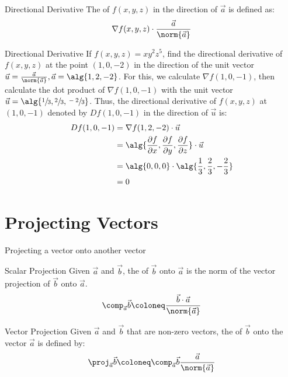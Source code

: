 \documentclass[12pt]{report}
\begin{document}
\begin{dfnbox}{Directional Derivative}{}
    The  of $f(x,y,z)$ in the direction of $\vec{a}$ is defined as:
    \[ \nabla f(x,y,z) \cdot \frac{\vec{a}}{\norm{\vec{a}}} \]
\end{dfnbox}

\begin{exbox}{Directional Derivative}{}
    If $f(x,y,z) = xy^2z^5$, find the directional derivative of $f(x,y,z)$ at the point $(1,0,-2)$ in the direction of the unit vector $\vec{u} = \frac{\vec{a}}{\norm{\vec{a}}}, \vec{a} = \alg{1,2,-2}$.
    \tcblower
    For this, we calculate $\nabla f(1,0,-1)$, then calculate the dot product of $\nabla f(1,0,-1)$ with the unit vector $\vec{u} = \alg{\sfrac{1}{3}, \sfrac{2}{3}, \sfrac{-2}{3}}$. Thus, the directional derivative of $f(x,y,z)$ at $(1,0,-1)$ denoted by $Df(1,0,-1)$ in the direction of $\vec{u}$ is:
    \begin{align*}
        Df(1,0,-1)
        &= \nabla f(1,2,-2) \cdot \vec{u} \\
        &= \alg{\frac{\partial f}{\partial x}, \frac{\partial f}{\partial y}, \frac{\partial f}{\partial z}} \cdot \vec{u} \\
        &= \alg{0,0,0} \cdot \alg{\frac13, \frac23, -\frac23} \\
        &= 0
    \end{align*}
\end{exbox}

\section{Projecting Vectors}
\newcommand{\vectorproj}[2][]{\textit{proj}_{\vect{#1}}\vect{#2}}

Projecting a vector onto another vector

\begin{dfnbox}{Scalar Projection}{}
    Given $\vec{a}$ and $\vec{b}$, the  of $\vec{b}$ onto $\vec{a}$ is the norm of the vector projection of $\vec{b}$ onto $\vec{a}$.
    \tcblower
    \[ \comp_{\vec{a}} \vec{b} \coloneq \frac{\vec{b} \cdot \vec{a}}{\norm{\vec{a}}} \]
\end{dfnbox}

\begin{dfnbox}{Vector Projection}{}
    Given $\vec{a}$ and $\vec{b}$ that are non-zero vectors, the  of $\vec{b}$ onto the vector $\vec{a}$ is defined by:
    \[ \proj_{\vec{a}} \vec{b} \coloneq \comp_{\vec{a}} \vec{b} \frac{\vec{a}}{\norm{\vec{a}}} \]
\end{dfnbox}
\end{document}
